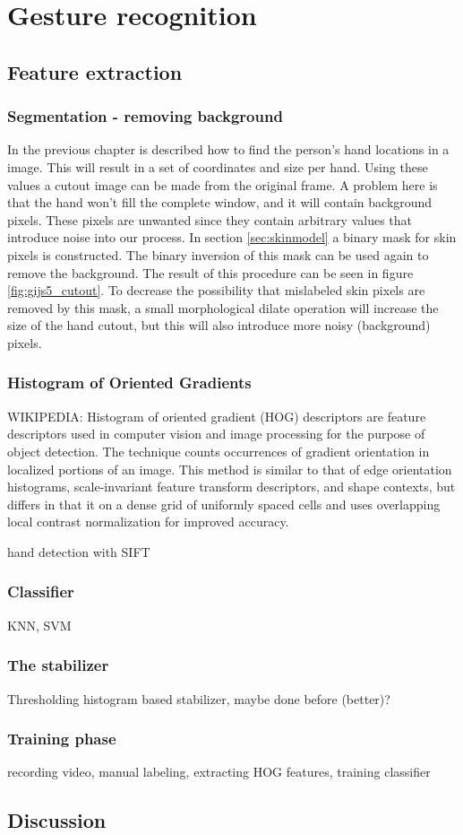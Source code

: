 
\chapter{Gesture recognition}
\label{ch:gestures}

\section{Feature extraction}

\subsection*{Segmentation - removing background}
In the previous chapter is described how to find the person's hand locations in a image. This will result in a set of coordinates and size per hand. Using these values a cutout image can be made from the original frame. A problem here is that the hand won't fill the complete window, and it will contain background pixels. These pixels are unwanted since they contain arbitrary values that introduce noise into our process. In section \ref{sec:skinmodel} a binary mask for skin pixels is constructed. The binary inversion of this mask can be used again to remove the background. The result of this procedure can be seen in figure \ref{fig:gijs5_cutout}. To decrease the possibility that mislabeled skin pixels are removed by this mask, a small morphological dilate operation will increase the size of the hand cutout, but this will also introduce more noisy (background) pixels. 


\subsection*{Histogram of Oriented Gradients}
WIKIPEDIA:
Histogram of oriented gradient (HOG) descriptors are feature descriptors used in computer vision and image processing for the purpose of object detection. The technique counts occurrences of gradient orientation in localized portions of an image. This method is similar to that of edge orientation histograms, scale-invariant feature transform descriptors, and shape contexts, but differs in that it on a dense grid of uniformly spaced cells and uses overlapping local contrast normalization for improved accuracy. \cite{watanabe2009}

hand detection with SIFT\cite{Wang_handposture}


\subsection*{Classifier}
KNN,  SVM

\subsection*{The stabilizer}
Thresholding histogram based stabilizer, maybe done before (better)?

\subsection*{Training phase}
recording video, manual labeling, extracting HOG features, training classifier

\section{Discussion}